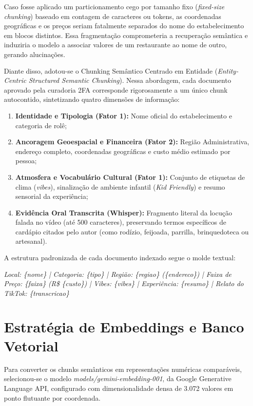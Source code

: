 \documentclass[11pt,a4paper]{article}
\begin{document}
Caso fosse aplicado um particionamento cego por tamanho fixo (\textit{fixed-size chunking}) baseado em contagem de caracteres ou tokens, as coordenadas geográficas e os preços seriam fatalmente separados do nome do estabelecimento em blocos distintos. Essa fragmentação comprometeria a recuperação semântica e induziria o modelo a associar valores de um restaurante ao nome de outro, gerando alucinações.

Diante disso, adotou-se o Chunking Semântico Centrado em Entidade (\textit{Entity-Centric Structured Semantic Chunking}). Nessa abordagem, cada documento aprovado pela curadoria 2FA corresponde rigorosamente a um único chunk autocontido, sintetizando quatro dimensões de informação:

\begin{enumerate}
\item \textbf{Identidade e Tipologia (Fator 1):} Nome oficial do estabelecimento e categoria de rolê;
\item \textbf{Ancoragem Geoespacial e Financeira (Fator 2):} Região Administrativa, endereço completo, coordenadas geográficas e custo médio estimado por pessoa;
\item \textbf{Atmosfera e Vocabulário Cultural (Fator 1):} Conjunto de etiquetas de clima (\textit{vibes}), sinalização de ambiente infantil (\textit{Kid Friendly}) e resumo sensorial da experiência;
\item \textbf{Evidência Oral Transcrita (Whisper):} Fragmento literal da locução falada no vídeo (até 500 caracteres), preservando termos específicos de cardápio citados pelo autor (como rodízio, feijoada, parrilla, brinquedoteca ou artesanal).
\end{enumerate}

A estrutura padronizada de cada documento indexado segue o molde textual:
\begin{center}
\textit{Local: \{nome\} | Categoria: \{tipo\} | Região: \{regiao\} (\{endereco\}) | Faixa de Preço: \{faixa\} (R\$ \{custo\}) | Vibes: \{vibes\} | Experiência: \{resumo\} | Relato do TikTok: \{transcricao\}}
\end{center}

\section{Estratégia de Embeddings e Banco Vetorial}

Para converter os chunks semânticos em representações numéricas comparáveis, selecionou-se o modelo \textit{models/gemini-embedding-001}, da Google Generative Language API, configurado com dimensionalidade densa de 3.072 valores em ponto flutuante por coordenada.
\end{document}
